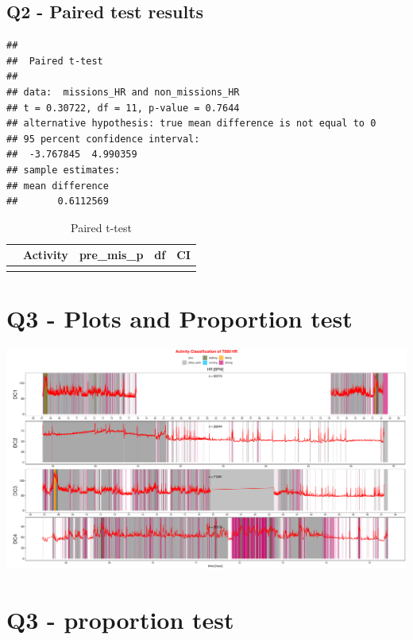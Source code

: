 \documentclass[
]{article}
\begin{document}
\subsection{Q2 - Paired test results}\label{q2---paired-test-results}

\begin{verbatim}
## 
##  Paired t-test
## 
## data:  missions_HR and non_missions_HR
## t = 0.30722, df = 11, p-value = 0.7644
## alternative hypothesis: true mean difference is not equal to 0
## 95 percent confidence interval:
##  -3.767845  4.990359
## sample estimates:
## mean difference 
##       0.6112569
\end{verbatim}

\begin{table}[!h]

\caption{\label{tab:unnamed-chunk-19}Paired t-test}
\centering
\fontsize{8}{10}\selectfont
\begin{tabular}[t]{llrrl}
\toprule
  & Activity & pre\_mis\_p & df & CI\\
\midrule
\cellcolor{gray!6}{df} & \cellcolor{gray!6}{HR} & \cellcolor{gray!6}{0.764} & \cellcolor{gray!6}{11} & \cellcolor{gray!6}{-3.768 - 4.99}\\
\bottomrule
\end{tabular}
\end{table}

\section{Q3 - Plots and Proportion
test}\label{q3---plots-and-proportion-test}

\includegraphics{HW4-Hints_files/figure-latex/unnamed-chunk-20-1.pdf}

\newpage

\section{Q3 - proportion test}\label{q3---proportion-test}
\end{document}
